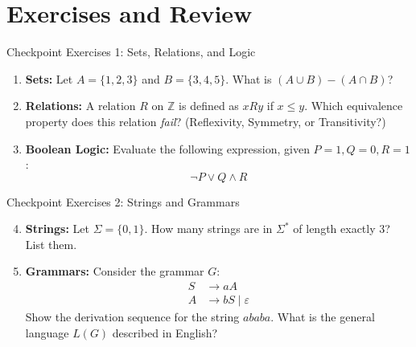 \documentclass[10pt]{beamer}
\begin{document}
\section{Exercises and Review}

\begin{frame}{Checkpoint Exercises 1: Sets, Relations, and Logic}
  \small
  \begin{enumerate}
      \item \textbf{Sets:} Let $A = \{1, 2, 3\}$ and $B = \{3, 4, 5\}$. 
      \newline What is $(A \cup B) - (A \cap B)$?
      \vspace{0.5cm}
      \item \textbf{Relations:} A relation $R$ on $\mathbb{Z}$ is defined as $x R y$ if $x \le y$. 
      \newline Which equivalence property does this relation \textit{fail}? (Reflexivity, Symmetry, or Transitivity?)
      \vspace{0.5cm}
      \item \textbf{Boolean Logic:} Evaluate the following expression, given $P = 1, Q = 0, R = 1$:
      \[ \neg P \vee Q \wedge R \]
  \end{enumerate}
\end{frame}

\begin{frame}{Checkpoint Exercises 2: Strings and Grammars}
  \small
  \begin{enumerate}
      \setcounter{enumi}{3}
      \item \textbf{Strings:} Let $\Sigma = \{0, 1\}$. How many strings are in $\Sigma^*$ of length exactly 3? List them.
      \vspace{0.5cm}
      \item \textbf{Grammars:} Consider the grammar $G$:
      \begin{align*}
          S &\rightarrow a A \\
          A &\rightarrow b S \mid \varepsilon
      \end{align*}
      Show the derivation sequence for the string $ababa$. What is the general language $L(G)$ described in English?
  \end{enumerate}
\end{frame}
\end{document}
